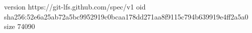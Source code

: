 version https://git-lfs.github.com/spec/v1
oid sha256:52e6a25ab72a5bc9952919c0bcaa178dd271aa8f9115c794b639919e4ff2a5a0
size 74090

